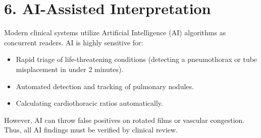 \section*{6. AI-Assisted Interpretation}
Modern clinical systems utilize Artificial Intelligence (AI) algorithms as concurrent readers. AI is highly sensitive for:
\begin{itemize}
    \item Rapid triage of life-threatening conditions (detecting a pneumothorax or tube misplacement in under 2 minutes).
    \item Automated detection and tracking of pulmonary nodules.
    \item Calculating cardiothoracic ratios automatically.
\end{itemize}
However, AI can throw false positives on rotated films or vascular congestion. Thus, all AI findings must be verified by clinical review.

\clearpage
